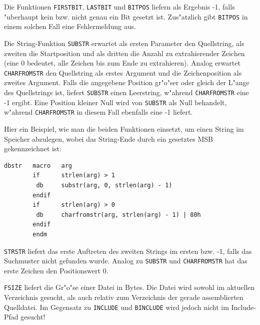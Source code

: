 \documentclass[12pt,a4paper,twoside]{report}
\newcommand{\tty}[1]{{\tt #1}}
\begin{document}
Die Funktionen \tty{FIRSTBIT}, \tty{LASTBIT} und \tty{BITPOS} liefern
als Ergebnis -1, falls "uberhaupt kein bzw. nicht genau ein Bit gesetzt
ist. Zus"atzlich gibt \tty{BITPOS} in einem solchen Fall eine
Fehlermeldung aus.
\par
Die String-Funktion \tty{SUBSTR} erwartet als ersten Parameter den
Quellstring, als zweiten die Startposition und als dritten die Anzahl zu
extrahierender Zeichen (eine 0 bedeutet, alle Zeichen bis zum Ende zu
extrahieren).  Analog erwartet \tty{CHARFROMSTR} den Quellstring als
erstes Argument und die Zeichenposition als zweites Argument.  Falls die
angegebene Position gr"o"ser oder gleich der L"ange des Quellstrings ist,
liefert \tty{SUBSTR} einen Leerstring, w"ahrend \tty{CHARFROMSTR} eine -1
ergibt.  Eine Position kleiner Null wird von \tty{SUBSTR} als Null
behandelt, w"ahrend \tty{CHARFROMSTR} in diesem Fall ebenfalls eine -1
liefert.

Hier ein Beispiel, wie man die beiden Funktionen einsetzt, um einen
String im Speicher abzulegen, wobei das String-Ende durch ein gesetztes
MSB gekennzeichnet ist:

\begin{verbatim}
dbstr   macro   arg
        if      strlen(arg) > 1
         db     substr(arg, 0, strlen(arg) - 1)
        endif
        if      strlen(arg) > 0
         db     charfromstr(arg, strlen(arg) - 1) | 80h
        endif
        endm
\end{verbatim}

\tty{STRSTR} liefert das erste Auftreten des zweiten Strings
im ersten bzw. -1, falls das Suchmuster nicht gefunden wurde.
Analog zu \tty{SUBSTR} und \tty{CHARFROMSTR} hat das erste
Zeichen den Positionswert 0.

\tty{FSIZE} liefert die Gr"o"se einer Datei in Bytes.  Die
Datei wird sowohl im aktuellen Verzeichnis gesucht, als auch
relativ zum Verzeichnis der gerade assemblierten Quelldatei.
Im Gegensatz zu \tty{INCLUDE} und \tty{BINCLUDE} wird jedoch
nicht im Include-Pfad gesucht!
\end{document}
